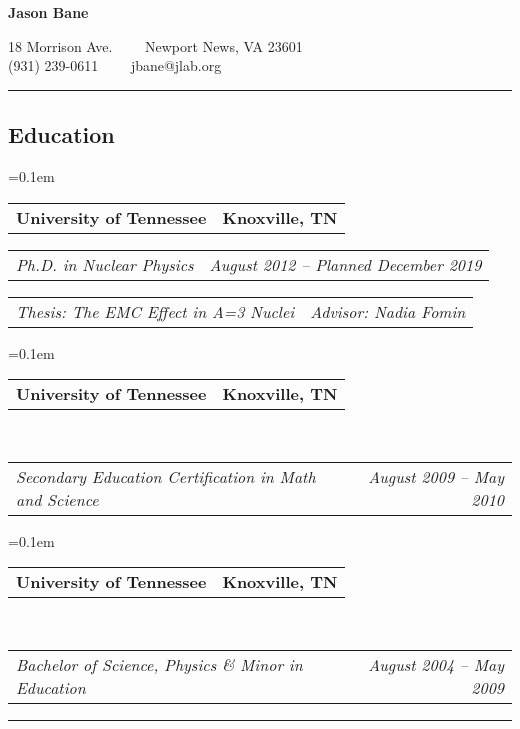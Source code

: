 \documentclass[12pt,letterpaper]{article}
\makeatletter
\newcommand{\headerrow}[2]
{\begin{tabular*}{\linewidth}{l@{\extracolsep{\fill}}r}
	#1 &
	#2 \\
\end{tabular*}}
\makeatother
\begin{document}
\begin{center}
{\LARGE \textbf{Jason Bane}}

18 Morrison Ave.\ \ \textbullet
\ \ Newport News, VA 23601 \\
(931) 239-0611\ \ \textbullet
\ \ jbane@jlab.org
\end{center}

\hrule
\vspace{-0.4em}
\subsection*{Education}

\begin{itemize*}
	\parskip=0.1em
	
	\item 
	\headerrow
	{\textbf{University of Tennessee}}
	{\textbf{Knoxville, TN}}
	
	\headerrow
	{\emph{Ph.D. in Nuclear Physics}}
	{\emph{August 2012 -- Planned December 2019}}
		\headerrow
	{\emph{Thesis: The EMC Effect in A=3 Nuclei}}
	{\emph{Advisor: Nadia Fomin}}
	
	
	\parskip=0.1em
	
	\item 
	\headerrow
	{\textbf{University of Tennessee}}
	{\textbf{Knoxville, TN}}
	\\
	\headerrow
	{\emph{Secondary Education Certification in Math and Science}}
	{\emph{August 2009 -- May 2010}}
	
	
	\parskip=0.1em
	
	\item 
	\headerrow
	{\textbf{University of Tennessee}}
	{\textbf{Knoxville, TN}}
	\\
	\headerrow
	{\emph{Bachelor of Science, Physics \& Minor in Education }}
	{\emph{August 2004 -- May 2009}}
	
	
\end{itemize*}
\hrule
\vspace{-0.4em}
\end{document}
